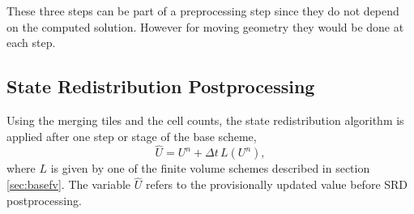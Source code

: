 
These three steps can be part of a preprocessing step since they do not
depend on the computed solution. However for moving geometry they would
be done at each step.

\vspace*{.1in}
\subsection{State Redistribution Postprocessing }
Using the merging tiles and the cell counts, the  state redistribution
algorithm is applied after one step or stage of the base scheme,
$$
\widehat{U} = U^n + \Delta t \, L(U^n),
$$
where $L$ is given by one of the finite volume schemes
described in section \ref{sec:basefv}. The variable $\widehat{U}$ refers to the
provisionally updated value before SRD postprocessing.

